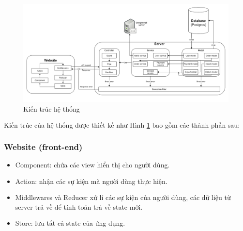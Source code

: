 \begin{figure}[H]
    \begin{center}
        \includegraphics[width=16cm]{Image/Technical/architecture.png}
        \caption{Kiến trúc hệ thống}
        \label{architecture}
    \end{center}
\end{figure}

Kiến trúc của hệ thống được thiết kế như Hình \ref{architecture} bao gồm các thành phần sau:
\subsubsection{Website (front-end)}
\begin{itemize}
    \item Component: chứa các view hiển thị cho người dùng.
    \item Action: nhận các sự kiện mà người dùng thực hiện.
    \item Middlewares và Reducer xử lí các sự kiện của người dùng, các dữ liệu từ server trả về để tính toán trả về state mới.
    \item Store: lưu tất cả state của ứng dụng.
\end{itemize}
